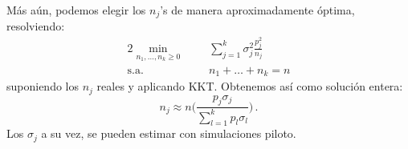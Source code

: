 \newp Más aún, podemos elegir los $n_j$'s de manera aproximadamente  \'optima,  resolviendo:
\begin{alignat*}{2}
    \displaystyle\min_{n_1,\dots,n_k\geq0}& & \sum^k_{j=1}\sigma^2_j\frac{p_j^2}{n_j}\\
    \mbox{s.a.  }& \mbox{    } & n_1+\dots+n_k=n 
\end{alignat*}
suponiendo los $n_j$ reales y aplicando KKT.  Obtenemos as\'i como soluci\'on entera:
$$ n_j\approx\displaystyle n\bigg(\frac{p_j\sigma_j}{\sum^k_{l=1}p_l\sigma_l}\bigg) \, .$$
Los $\sigma_j$ a su vez, se pueden estimar con simulaciones piloto.

